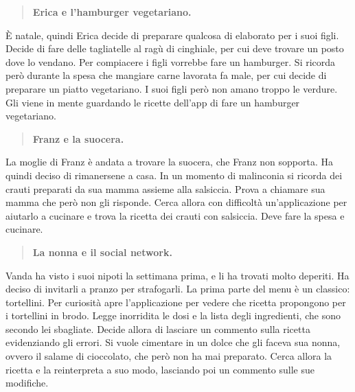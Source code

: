 \begin{quote}
	\textbf{Erica e l'hamburger vegetariano.}
\end{quote}
È natale, quindi Erica decide di preparare qualcosa di elaborato per i suoi figli. Decide di fare delle tagliatelle al ragù di cinghiale, per cui deve trovare un posto dove lo vendano. Per compiacere i figli vorrebbe fare un hamburger. Si ricorda però durante la spesa che mangiare carne lavorata fa male, per cui decide di preparare un piatto vegetariano. I suoi figli però non amano troppo le verdure. Gli viene in mente guardando le ricette dell’app di fare un hamburger vegetariano.
\begin{quote}
	\textbf{Franz e la suocera.}
\end{quote}
La moglie di Franz è andata a trovare la suocera, che Franz non sopporta. Ha quindi deciso di rimanersene a casa. In un momento di malinconia si ricorda dei crauti preparati da sua mamma assieme alla salsiccia. Prova a chiamare sua mamma che però non gli risponde. Cerca allora con difficoltà un’applicazione per aiutarlo a cucinare e trova la ricetta dei crauti con salsiccia. Deve fare la spesa e cucinare.
\begin{quote}
	\textbf{La nonna e il social network.}
\end{quote}
Vanda ha visto i suoi nipoti la settimana prima, e li ha trovati molto deperiti. Ha deciso di invitarli a pranzo per strafogarli. La prima parte del menu è un classico: tortellini. Per curiosità apre l’applicazione per vedere che ricetta propongono per i tortellini in brodo. Legge inorridita le dosi e la lista degli ingredienti, che sono secondo lei sbagliate. Decide allora di lasciare un commento sulla ricetta evidenziando gli errori. Si vuole cimentare in un dolce che gli faceva sua nonna, ovvero il salame di cioccolato, che però non ha mai preparato. Cerca allora la ricetta e la reinterpreta a suo modo, lasciando poi un commento sulle sue modifiche.
